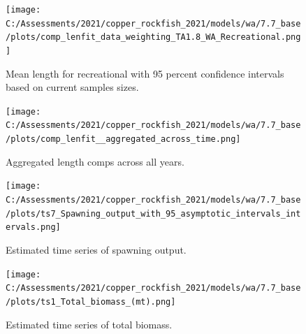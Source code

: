 \documentclass[11pt,
  english,
  a4paper,
]{article}
\begin{document}
\tagmcend\tagstructend


\begin{figure}
\centering
\texttt{[image: C:/Assessments/2021/copper\_rockfish\_2021/models/wa/7.7\_base/plots/comp\_lenfit\_data\_weighting\_TA1.8\_WA\_Recreational.png]}
\caption{Mean length for recreational with 95 percent confidence intervals based on current samples sizes.\label{fig:rec-mean-len-fit}}
\end{figure}

\tagmcend\tagstructend


\begin{figure}
\centering
\texttt{[image: C:/Assessments/2021/copper\_rockfish\_2021/models/wa/7.7\_base/plots/comp\_lenfit\_\_aggregated\_across\_time.png]}
\caption{Aggregated length comps across all years.\label{fig:agg-len-fit}}
\end{figure}

\tagmcend\tagstructend


\begin{figure}
\centering
\texttt{[image: C:/Assessments/2021/copper\_rockfish\_2021/models/wa/7.7\_base/plots/ts7\_Spawning\_output\_with\_95\_asymptotic\_intervals\_intervals.png]}
\caption{Estimated time series of spawning output.\label{fig:ssb}}
\end{figure}

\tagmcend\tagstructend


\begin{figure}
\centering
\texttt{[image: C:/Assessments/2021/copper\_rockfish\_2021/models/wa/7.7\_base/plots/ts1\_Total\_biomass\_(mt).png]}
\caption{Estimated time series of total biomass.\label{fig:tot-bio}}
\end{figure}

\tagmcend\tagstructend

\end{document}
